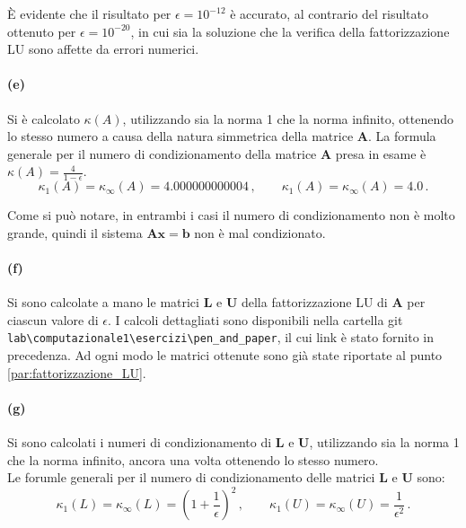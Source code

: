 \documentclass[letterpaper, 12pt]{article}
\begin{document}
È evidente che il risultato per $\epsilon = 10^{-12}$ è accurato, al contrario del risultato ottenuto per
$\epsilon = 10^{-20}$, in cui sia la soluzione che la verifica della fattorizzazione LU sono
affette da errori numerici.

\paragraph{(e) } Si è calcolato $\kappa(A)$, utilizzando sia la norma 1 che la norma infinito, ottenendo lo stesso
numero a causa della natura simmetrica della matrice $\mathbf{A}$. La formula generale per il numero di
condizionamento della matrice $\mathbf{A}$ presa in esame è $ \kappa(A) = \frac{4}{1 - \epsilon}$.
\begin{equation}
    \kappa_1(A) = \kappa_\infty(A) =  4.000000000004\,,
    \qquad
    \kappa_1(A) = \kappa_\infty(A) =  4.0\,.
\end{equation}

Come si può notare, in entrambi i casi il numero di condizionamento non è molto grande, quindi il sistema
$\mathbf{Ax} = \mathbf{b}$ non è mal condizionato. 

\paragraph{(f) } Si sono calcolate a mano le matrici $\mathbf{L}$ e $\mathbf{U}$ della fattorizzazione LU di
$\mathbf{A}$ per ciascun valore di $\epsilon$. I calcoli dettagliati sono disponibili nella cartella git
\verb|lab\computazionale1\esercizi\pen_and_paper|, il cui link è stato fornito in precedenza. Ad ogni modo le 
matrici ottenute sono già state riportate al punto \ref{par:fattorizzazione_LU}. \\

\paragraph{(g) } Si sono calcolati i numeri di condizionamento di $\mathbf{L}$ e $\mathbf{U}$, utilizzando sia 
la norma 1 che la norma infinito, ancora una volta ottenendo lo stesso numero. \\
Le forumle generali per il numero di condizionamento delle matrici $\mathbf{L}$ e $\mathbf{U}$ sono:
\begin{equation}
    \kappa_1(L) = \kappa_\infty(L) = \left(1 + \frac{1}{\epsilon}\right)^2\,,
    \qquad
    \kappa_1(U) = \kappa_\infty(U) = \frac{1}{\epsilon^2}\,.
\end{equation}
\end{document}
